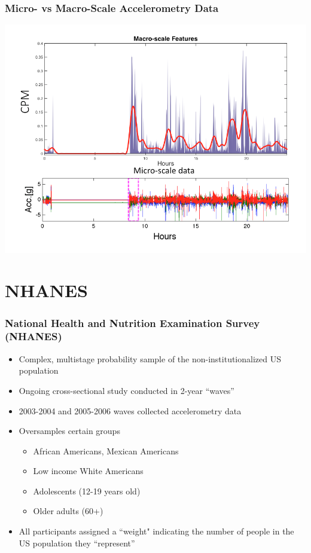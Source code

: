 \documentclass[10pt]{beamer}\usepackage[]{graphicx}\usepackage[]{color}
\newcommand\blfootnote[1]{%
  \begingroup
  \renewcommand\thefootnote{}\footnote{#1}%
  \addtocounter{footnote}{-1}%
  \endgroup
}
\begin{document}
% 

\begin{frame}
\frametitle{Micro- vs Macro-Scale Accelerometry Data}
\includegraphics[width=\textwidth]{micro_vs_macro_accel_data}
\end{frame}





\section{NHANES}

\begin{frame}
\frametitle{National Health and Nutrition Examination Survey (NHANES)}
\begin{itemize}
\item Complex, multistage probability sample of the non-institutionalized US population
\item Ongoing cross-sectional study conducted in 2-year ``waves''
\item 2003-2004 and 2005-2006 waves collected accelerometry data
\item Oversamples certain groups
    \begin{itemize}
    \item African Americans, Mexican Americans
    \item Low income White Americans
    \item Adolescents (12-19 years old)
    \item Older adults (60+)
    \end{itemize}
\item All participants assigned a ``weight" indicating the number of people in the US population they ``represent''
\end{itemize}

\end{frame}
\end{document}
